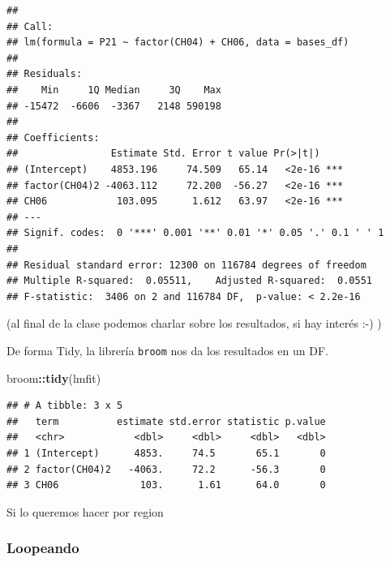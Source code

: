 \documentclass[]{book}
\newenvironment{Shaded}{\begin{snugshade}}{\end{snugshade}}
\newcommand{\KeywordTok}[1]{\textcolor[rgb]{0.13,0.29,0.53}{\textbf{#1}}}
\newcommand{\NormalTok}[1]{#1}
\newcommand{\OperatorTok}[1]{\textcolor[rgb]{0.81,0.36,0.00}{\textbf{#1}}}
\begin{document}
\begin{verbatim}
## 
## Call:
## lm(formula = P21 ~ factor(CH04) + CH06, data = bases_df)
## 
## Residuals:
##    Min     1Q Median     3Q    Max 
## -15472  -6606  -3367   2148 590198 
## 
## Coefficients:
##                Estimate Std. Error t value Pr(>|t|)    
## (Intercept)    4853.196     74.509   65.14   <2e-16 ***
## factor(CH04)2 -4063.112     72.200  -56.27   <2e-16 ***
## CH06            103.095      1.612   63.97   <2e-16 ***
## ---
## Signif. codes:  0 '***' 0.001 '**' 0.01 '*' 0.05 '.' 0.1 ' ' 1
## 
## Residual standard error: 12300 on 116784 degrees of freedom
## Multiple R-squared:  0.05511,    Adjusted R-squared:  0.0551 
## F-statistic:  3406 on 2 and 116784 DF,  p-value: < 2.2e-16
\end{verbatim}

(al final de la clase podemos charlar sobre los resultados, si hay interés :-) )

De forma Tidy, la librería \texttt{broom} nos da los resultados en un DF.

\begin{Shaded}
\begin{Highlighting}[]
\NormalTok{broom}\OperatorTok{::}\KeywordTok{tidy}\NormalTok{(lmfit)}
\end{Highlighting}
\end{Shaded}

\begin{verbatim}
## # A tibble: 3 x 5
##   term          estimate std.error statistic p.value
##   <chr>            <dbl>     <dbl>     <dbl>   <dbl>
## 1 (Intercept)      4853.     74.5       65.1       0
## 2 factor(CH04)2   -4063.     72.2      -56.3       0
## 3 CH06              103.      1.61      64.0       0
\end{verbatim}

Si lo queremos hacer por region

\hypertarget{loopeando}{%
\subsubsection{Loopeando}\label{loopeando}}
\end{document}
